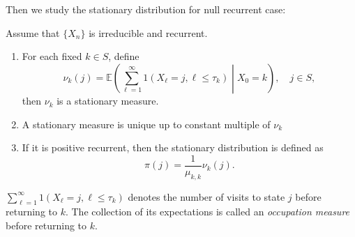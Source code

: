 Then we study the stationary distribution for null recurrent case:
\begin{theorem}
Assume that $\{X_n\}$ is irreducible and recurrent.
\begin{enumerate}
\item
For each fixed $k\in S$, define
\[
\nu_k(j)=\mathbb{E}\left(
\sum_{\ell=1}^\infty1(X_{\ell}=j, \ell\le \tau_k)\middle| X_0=k
\right),\quad j\in S,
\]
then $\nu_k$ is a stationary measure.
\item
A stationary measure is unique up to constant multiple of $\nu_k$
\item
If it is positive recurrent, then the stationary distribution is defined as
\[
\pi(j)=\frac{1}{\mu_{k,k}}\nu_k(j).
\]
\end{enumerate}
\end{theorem}
\begin{remark}
$\sum_{\ell=1}^\infty1(X_{\ell}=j, \ell\le \tau_k)$ denotes the number of visits to state $j$ before returning to $k$.
The collection of its expectations is called an \emph{occupation measure} before returning to $k$.
\end{remark}

